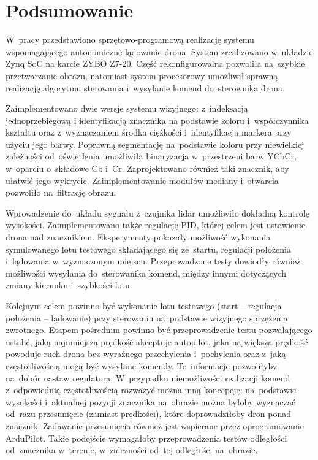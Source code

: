 \chapter{Podsumowanie}
\label{cha:Podsumowanie i kierunki dalszych prac}

W~pracy przedstawiono sprzętowo-programową realizację systemu wspomagającego autonomiczne lądowanie drona.
System zrealizowano w~układzie Zynq SoC na karcie ZYBO Z7-20. 
Część rekonfigurowalna pozwoliła na~szybkie przetwarzanie obrazu, natomiast system procesorowy umożliwił sprawną realizację algorytmu sterowania i~wysyłanie komend do~sterownika drona. 

Zaimplementowano dwie wersje systemu wizyjnego: z~indeksacją jednoprzebiegową i identyfikacją znacznika na podstawie koloru i~współczynnika kształtu oraz z~wyznaczaniem środka ciężkości i~identyfikacją markera przy użyciu jego barwy. 
Poprawną segmentację na~podstawie koloru przy niewielkiej zależności od~oświetlenia umożliwiła binaryzacja w~przestrzeni barw YCbCr, w~oparciu o~składowe Cb i~Cr. 
Zaprojektowano również taki znacznik, aby ułatwić jego wykrycie. 
Zaimplementowanie modułów mediany i~otwarcia pozwoliło na~filtrację obrazu.

Wprowadzenie do~układu sygnału z~czujnika lidar umożliwiło dokładną kontrolę wysokości.
Zaimplementowano także regulację PID, której celem jest ustawienie drona nad znacznikiem. 
Eksperymenty pokazały możliwość wykonania symulowanego lotu testowego składającego się ze~startu, regulacji położenia i~lądowania w~wyznaczonym miejscu.
Przeprowadzone testy dowiodły również możliwości wysyłania do~sterowanika komend, między innymi dotyczących zmiany kierunku i~szybkości lotu. 

Kolejnym celem powinno być wykonanie lotu testowego (start -- regulacja położenia -- lądowanie) przy sterowaniu na~podstawie wizyjnego sprzężenia zwrotnego. 
Etapem pośrednim powinno być przeprowadzenie testu pozwalającego ustalić, jaką najmniejszą prędkość akceptuje autopilot, jaka największa prędkość powoduje ruch drona bez wyraźnego przechylenia i~pochylenia oraz z~jaką częstotliwością mogą być wysyłane komendy. 
Te~informacje pozwoliłyby na~dobór nastaw regulatora. 
W~przypadku niemożliwości realizacji komend z~odpowiednią częstotliwością rozważyć można inną koncepcję: na~podstawie wysokości i~aktualnej pozycji znacznika na~obrazie można byłoby wyznaczać od~razu przesunięcie (zamiast prędkości), które doprowadziłoby dron ponad znacznik. Zadawanie przesunięcia również jest wspierane przez oprogramowanie ArduPilot. Takie podejście wymagałoby przeprowadzenia testów odległości od~znacznika w~terenie, w~zależności od~tej odległości na~obrazie. %

